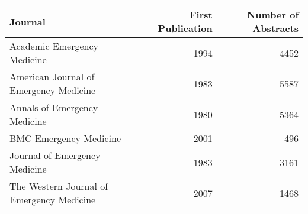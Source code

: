 \begin{tabular}{lrr}
\toprule
                                   Journal &  First Publication &  Number of Abstracts \\
\midrule
               Academic Emergency Medicine &               1994 &                 4452 \\
    American Journal of Emergency Medicine &               1983 &                 5587 \\
              Annals of Emergency Medicine &               1980 &                 5364 \\
                    BMC Emergency Medicine &               2001 &                  496 \\
             Journal of Emergency Medicine &               1983 &                 3161 \\
 The Western Journal of Emergency Medicine &               2007 &                 1468 \\
\bottomrule
\end{tabular}
